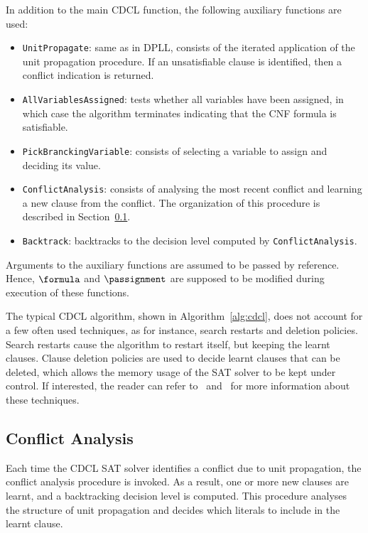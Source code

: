 In addition to the main CDCL function, the following auxiliary functions are
used:
\begin{itemize}
    \item \texttt{UnitPropagate}:
        same as in DPLL, consists of the iterated application of the unit
        propagation procedure. If an unsatisfiable clause is identified, then a
        conflict indication is returned.
    \item \texttt{AllVariablesAssigned}:
        tests whether all variables have been assigned, in which case the
        algorithm terminates indicating that the CNF formula is satisfiable. 
    \item \texttt{PickBranckingVariable}:
        consists of selecting a variable to assign and deciding its value.
    \item \texttt{ConflictAnalysis}:
        consists of analysing the most recent conflict and learning a new clause
        from the conflict. The organization of this procedure is described in
        Section~\ref{sec:conflictanalysis}.
    \item \texttt{Backtrack}:
        backtracks to the decision level computed by \texttt{ConflictAnalysis}.
\end{itemize}

Arguments to the auxiliary functions are assumed to be passed by reference.
Hence, $\formula$ and $\passignment$ are supposed to be modified during execution
of these functions.

The typical CDCL algorithm, shown in Algorithm~\ref{alg:cdcl}, does not account
for a few often used techniques, as for instance, search restarts and deletion
policies. Search restarts cause the algorithm to restart itself, but keeping the
learnt clauses.  Clause deletion policies are used to decide learnt clauses that
can be deleted, which allows the memory usage of the SAT solver to be kept under
control. If interested, the reader can refer to~\cite{cdclchapter}
and~\cite{satchapter} for more information about these techniques.

\subsection{Conflict Analysis}%
\label{sec:conflictanalysis}

Each time the CDCL SAT solver identifies a conflict due to unit propagation, the
conflict analysis procedure is invoked. As a result, one or more new clauses are
learnt, and a backtracking decision level is computed. This procedure analyses
the structure of unit propagation and decides which literals to include in the
learnt clause.

